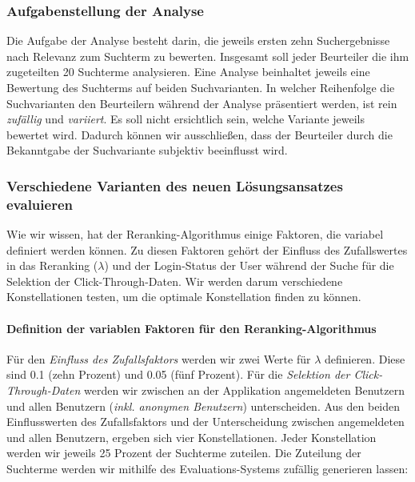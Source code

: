 \subsubsection{Aufgabenstellung der Analyse}
\label{sec:Evaluation:Aufbau:Durchfuehrung:Aufgabenstellung}

Die Aufgabe der Analyse besteht darin, die jeweils ersten zehn Suchergebnisse nach Relevanz zum Suchterm zu bewerten. Insgesamt soll jeder Beurteiler die ihm zugeteilten 20 Suchterme analysieren. Eine Analyse beinhaltet jeweils eine Bewertung des Suchterms auf beiden Suchvarianten. In welcher Reihenfolge die Suchvarianten den Beurteilern während der Analyse präsentiert werden, ist rein \textit{zufällig} und \textit{variiert}. Es soll nicht ersichtlich sein, welche Variante jeweils bewertet wird. Dadurch können wir ausschließen, dass der Beurteiler durch die Bekanntgabe der Suchvariante subjektiv beeinflusst wird. 

\subsubsection{Verschiedene Varianten des neuen Lösungsansatzes evaluieren}
\label{sec:Evaluation:Aufbau:Durchfuehrung:EvaluationsdatenVarianteLoesungsansatzes}

Wie wir wissen, hat der Reranking-Algorithmus einige Faktoren, die variabel definiert werden können. Zu diesen Faktoren gehört der Einfluss des Zufallswertes in das Reranking ($\lambda$) und der \glqq Login-Status der User\grqq{} während der Suche für die Selektion der Click-Through-Daten. Wir werden darum verschiedene Konstellationen testen, um die optimale Konstellation finden zu können. 

\paragraph{Definition der variablen Faktoren für den Reranking-Algorithmus}
Für den \textit{Einfluss des Zufallsfaktors} werden wir zwei Werte für $\lambda$ definieren. Diese sind 0.1 (zehn Prozent) und 0.05 (fünf Prozent). Für die \textit{Selektion der Click-Through-Daten} werden wir zwischen an der Applikation angemeldeten Benutzern und allen Benutzern (\textit{inkl. anonymen Benutzern}) unterscheiden. Aus den beiden Einflusswerten des Zufallsfaktors und der Unterscheidung zwischen angemeldeten und allen Benutzern, ergeben sich vier Konstellationen. Jeder Konstellation werden wir jeweils 25 Prozent der Suchterme zuteilen. Die Zuteilung der Suchterme werden wir mithilfe des Evaluations-Systems zufällig generieren lassen:

